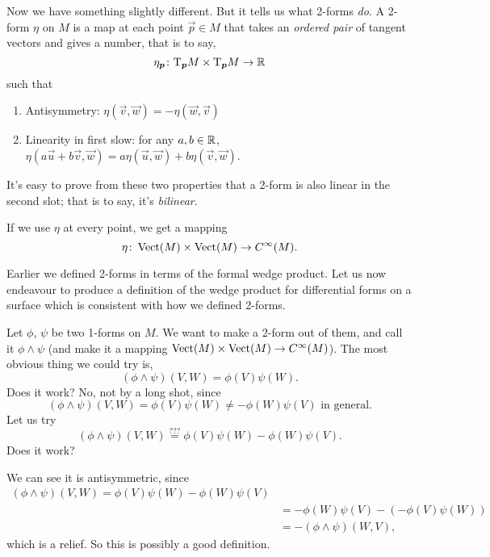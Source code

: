  Now we have something slightly different. But it tells us
what 2-forms \emph{do}. A 2-form $\eta$ on $M$ is a map at each point
$\vec{p}\in M$ that takes an \emph{ordered pair} of tangent vectors and
gives a number, that is to say,
\begin{equation}
\eta_{\boldsymbol{p}}\colon\mathrm{T}_{\boldsymbol{p}}M\times\mathrm{T}_{\boldsymbol{p}}M\to\mathbb{R}
\end{equation}
such that
\begin{enumerate}
\item Antisymmetry: $\eta(\vec{v},\vec{w}) = -\eta(\vec{w},\vec{v})$
\item Linearity in first slow: for any $a,b\in\mathbb{R}$,
  $\eta(a\vec{u}+b\vec{v},\vec{w}) = a\eta(\vec{u},\vec{w})+b\eta(\vec{v},\vec{w})$.
\end{enumerate}
It's easy to prove from these two properties that a 2-form is also
linear in the second slot; that is to say, it's \emph{bilinear}.

If we use $\eta$ at every point, we get a mapping
\begin{equation}
\eta\colon\operatorname{Vect}(M)\times\operatorname{Vect}(M)\to C^{\infty}(M).
\end{equation}

Earlier we defined 2-forms in terms of the formal wedge product. Let us now
endeavour to produce a definition of the wedge product for differential
forms on a surface which is consistent with how we defined 2-forms.

Let $\phi$, $\psi$ be two 1-forms on $M$. We want to make a 2-form out
of them, and call it $\phi\wedge\psi$ (and make it a mapping
$\operatorname{Vect}(M)\times\operatorname{Vect}(M)\to C^{\infty}(M)$). The most obvious thing we
could try is,
\begin{equation}
(\phi\wedge\psi)(V,W) = \phi(V)\psi(W).
\end{equation}
Does it work? No, not by a long shot, since
\begin{equation}
(\phi\wedge\psi)(V,W)=\phi(V)\psi(W)\neq-\phi(W)\psi(V)\mbox{ in general}.
\end{equation}
Let us try
\begin{equation}
(\phi\wedge\psi)(V,W)\stackrel{???}{=}\phi(V)\psi(W)-\phi(W)\psi(V).
\end{equation}
Does it work?

We can see it is antisymmetric, since
\begin{subequations}
  \begin{align}
    (\phi\wedge\psi)(V,W)=\phi(V)\psi(W)-\phi(W)\psi(V)\\
    &=-\phi(W)\psi(V)-(-\phi(V)\psi(W))\\
    &=-(\phi\wedge\psi)(W,V),
  \end{align}
\end{subequations}
which is a relief. So this is possibly a good definition.

